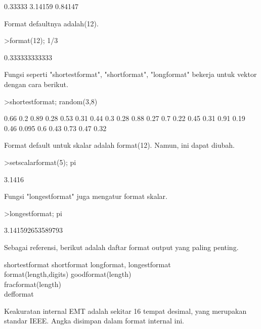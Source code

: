 \documentclass[a4paper,10pt]{article}
\begin{document}
\begin{eulernotebook}
\begin{eulercomment}
\begin{eulercomment}
\begin{euleroutput}
      0.33333 
      3.14159 
      0.84147 
\end{euleroutput}
\begin{eulercomment}
Format defaultnya adalah(12).
\end{eulercomment}
\begin{eulerprompt}
>format(12); 1/3
\end{eulerprompt}
\begin{euleroutput}
  0.333333333333
\end{euleroutput}
\begin{eulercomment}
Fungsi seperti "shortestformat", "shortformat", "longformat" bekerja
untuk vektor dengan cara berikut.
\end{eulercomment}
\begin{eulerprompt}
>shortestformat; random(3,8)
\end{eulerprompt}
\begin{euleroutput}
    0.66    0.2   0.89   0.28   0.53   0.31   0.44    0.3 
    0.28   0.88   0.27    0.7   0.22   0.45   0.31   0.91 
    0.19   0.46  0.095    0.6   0.43   0.73   0.47   0.32 
\end{euleroutput}
\begin{eulercomment}
Format default untuk skalar adalah format(12). Namun, ini dapat
diubah.
\end{eulercomment}
\begin{eulerprompt}
>setscalarformat(5); pi
\end{eulerprompt}
\begin{euleroutput}
  3.1416
\end{euleroutput}
\begin{eulercomment}
Fungsi "longestformat" juga mengatur format skalar.
\end{eulercomment}
\begin{eulerprompt}
>longestformat; pi
\end{eulerprompt}
\begin{euleroutput}
  3.141592653589793
\end{euleroutput}
\begin{eulercomment}
Sebagai referensi, berikut adalah daftar format output yang paling
penting.

shortestformat shortformat longformat, longestformat\\
format(length,digits) goodformat(length)\\
fracformat(length)\\
defformat

Keakuratan internal EMT adalah sekitar 16 tempat desimal, yang
merupakan standar IEEE. Angka disimpan dalam format internal ini.


\end{eulercomment}
\end{eulercomment}
\end{eulercomment}
\end{eulernotebook}
\end{document}
